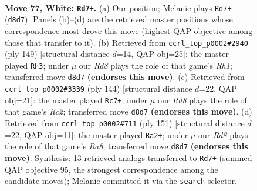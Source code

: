 \documentclass[11pt]{article}
\begin{document}
\clearpage

\begin{figure}[p]\centering
\begin{subfigure}{0.46\textwidth}\centering
\resizebox{\linewidth}{!}{%
\newchessgame
\chessboard[
  setfen={3R4/7k/8/8/p1p5/PrP4p/7P/6K1 w - - 4 77},
  showmover=false,
  pgfstyle=straightmove, color=movearrow, markmove={d8-d7}
]}
\caption{}
\end{subfigure}\hfill
\begin{subfigure}{0.46\textwidth}\centering
\resizebox{\linewidth}{!}{%
\newchessgame
\chessboard[
  setfen={7r/4k3/8/1pR3p1/pP4P1/P7/2K5/8 b - - 0 75},
  showmover=false,
  pgfstyle=straightmove, color=movearrow, markmove={h8-h3}
]}
\caption{}
\end{subfigure}
\\[4pt]
\begin{subfigure}{0.46\textwidth}\centering
\resizebox{\linewidth}{!}{%
\newchessgame
\chessboard[
  setfen={8/5k2/8/4p1p1/6P1/4KP1p/2R4P/7r w - - 15 73},
  showmover=false,
  pgfstyle=straightmove, color=movearrow, markmove={c2-c7}
]}
\caption{}
\end{subfigure}\hfill
\begin{subfigure}{0.46\textwidth}\centering
\resizebox{\linewidth}{!}{%
\newchessgame
\chessboard[
  setfen={8/5pk1/8/5PP1/3R1p2/8/5K2/r7 b - - 0 76},
  showmover=false,
  pgfstyle=straightmove, color=movearrow, markmove={a1-a2}
]}
\caption{}
\end{subfigure}
\caption{\textbf{Move 77, White: \texttt{Rd7+}.} (a) Our position; Melanie plays \texttt{Rd7+} (\texttt{d8d7}). Panels (b)--(d) are the retrieved master positions whose correspondence most drove this move (highest QAP objective among those that transfer to it). (b) Retrieved from \texttt{ccrl\_top\_p0002\#2940} (ply 149) [structural distance $d$=14, QAP obj=25]: the master played \texttt{Rh3}; under $\mu$ our \emph{Rd8} plays the role of that game's \emph{Rh1}; transferred move \texttt{d8d7} \textbf{(endorses this move)}. (c) Retrieved from \texttt{ccrl\_top\_p0002\#3339} (ply 144) [structural distance $d$=22, QAP obj=21]: the master played \texttt{Rc7+}; under $\mu$ our \emph{Rd8} plays the role of that game's \emph{Rc2}; transferred move \texttt{d8d7} \textbf{(endorses this move)}. (d) Retrieved from \texttt{ccrl\_top\_p0002\#711} (ply 151) [structural distance $d$=22, QAP obj=11]: the master played \texttt{Ra2+}; under $\mu$ our \emph{Rd8} plays the role of that game's \emph{Ra8}; transferred move \texttt{d8d7} \textbf{(endorses this move)}. Synthesis: 13 retrieved analogs transferred to \texttt{Rd7+} (summed QAP objective 95, the strongest correspondence among the candidate moves); Melanie committed it via the \texttt{search} selector.}
\label{fig:thought-m152}
\end{figure}
\end{document}
